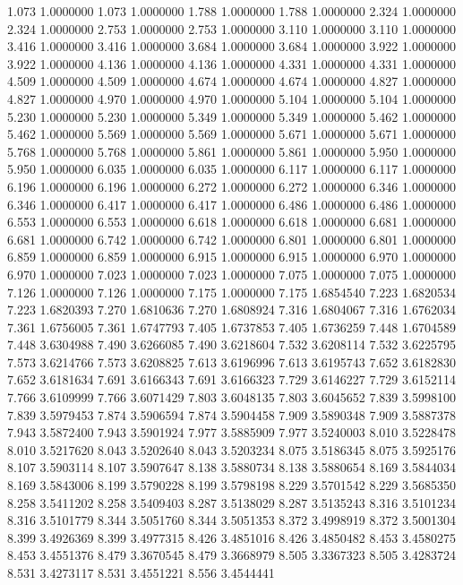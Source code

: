 1.073 1.0000000
1.073 1.0000000
1.788 1.0000000
1.788 1.0000000
2.324 1.0000000
2.324 1.0000000
2.753 1.0000000
2.753 1.0000000
3.110 1.0000000
3.110 1.0000000
3.416 1.0000000
3.416 1.0000000
3.684 1.0000000
3.684 1.0000000
3.922 1.0000000
3.922 1.0000000
4.136 1.0000000
4.136 1.0000000
4.331 1.0000000
4.331 1.0000000
4.509 1.0000000
4.509 1.0000000
4.674 1.0000000
4.674 1.0000000
4.827 1.0000000
4.827 1.0000000
4.970 1.0000000
4.970 1.0000000
5.104 1.0000000
5.104 1.0000000
5.230 1.0000000
5.230 1.0000000
5.349 1.0000000
5.349 1.0000000
5.462 1.0000000
5.462 1.0000000
5.569 1.0000000
5.569 1.0000000
5.671 1.0000000
5.671 1.0000000
5.768 1.0000000
5.768 1.0000000
5.861 1.0000000
5.861 1.0000000
5.950 1.0000000
5.950 1.0000000
6.035 1.0000000
6.035 1.0000000
6.117 1.0000000
6.117 1.0000000
6.196 1.0000000
6.196 1.0000000
6.272 1.0000000
6.272 1.0000000
6.346 1.0000000
6.346 1.0000000
6.417 1.0000000
6.417 1.0000000
6.486 1.0000000
6.486 1.0000000
6.553 1.0000000
6.553 1.0000000
6.618 1.0000000
6.618 1.0000000
6.681 1.0000000
6.681 1.0000000
6.742 1.0000000
6.742 1.0000000
6.801 1.0000000
6.801 1.0000000
6.859 1.0000000
6.859 1.0000000
6.915 1.0000000
6.915 1.0000000
6.970 1.0000000
6.970 1.0000000
7.023 1.0000000
7.023 1.0000000
7.075 1.0000000
7.075 1.0000000
7.126 1.0000000
7.126 1.0000000
7.175 1.0000000
7.175 1.6854540
7.223 1.6820534
7.223 1.6820393
7.270 1.6810636
7.270 1.6808924
7.316 1.6804067
7.316 1.6762034
7.361 1.6756005
7.361 1.6747793
7.405 1.6737853
7.405 1.6736259
7.448 1.6704589
7.448 3.6304988
7.490 3.6266085
7.490 3.6218604
7.532 3.6208114
7.532 3.6225795
7.573 3.6214766
7.573 3.6208825
7.613 3.6196996
7.613 3.6195743
7.652 3.6182830
7.652 3.6181634
7.691 3.6166343
7.691 3.6166323
7.729 3.6146227
7.729 3.6152114
7.766 3.6109999
7.766 3.6071429
7.803 3.6048135
7.803 3.6045652
7.839 3.5998100
7.839 3.5979453
7.874 3.5906594
7.874 3.5904458
7.909 3.5890348
7.909 3.5887378
7.943 3.5872400
7.943 3.5901924
7.977 3.5885909
7.977 3.5240003
8.010 3.5228478
8.010 3.5217620
8.043 3.5202640
8.043 3.5203234
8.075 3.5186345
8.075 3.5925176
8.107 3.5903114
8.107 3.5907647
8.138 3.5880734
8.138 3.5880654
8.169 3.5844034
8.169 3.5843006
8.199 3.5790228
8.199 3.5798198
8.229 3.5701542
8.229 3.5685350
8.258 3.5411202
8.258 3.5409403
8.287 3.5138029
8.287 3.5135243
8.316 3.5101234
8.316 3.5101779
8.344 3.5051760
8.344 3.5051353
8.372 3.4998919
8.372 3.5001304
8.399 3.4926369
8.399 3.4977315
8.426 3.4851016
8.426 3.4850482
8.453 3.4580275
8.453 3.4551376
8.479 3.3670545
8.479 3.3668979
8.505 3.3367323
8.505 3.4283724
8.531 3.4273117
8.531 3.4551221
8.556 3.4544441
